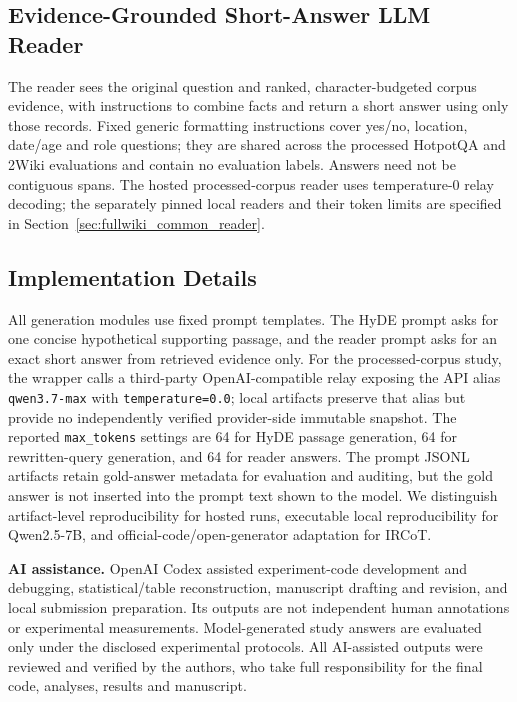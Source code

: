 \subsection{Evidence-Grounded Short-Answer LLM Reader}
\label{sec:short_answer_reader}

The reader sees the original question and ranked, character-budgeted corpus evidence, with instructions to combine facts and return a short answer using only those records. Fixed generic formatting instructions cover yes/no, location, date/age and role questions; they are shared across the processed HotpotQA and 2Wiki evaluations and contain no evaluation labels. Answers need not be contiguous spans. The hosted processed-corpus reader uses temperature-0 relay decoding; the separately pinned local readers and their token limits are specified in Section~\ref{sec:fullwiki_common_reader}.

\subsection{Implementation Details}
\label{sec:implementation_boundary}

All generation modules use fixed prompt templates. The HyDE prompt asks for one concise hypothetical supporting passage, and the reader prompt asks for an exact short answer from retrieved evidence only. For the processed-corpus study, the wrapper calls a third-party OpenAI-compatible relay exposing the API alias \texttt{qwen3.7-max} with \texttt{temperature=0.0}; local artifacts preserve that alias but provide no independently verified provider-side immutable snapshot. The reported \texttt{max\_tokens} settings are 64 for HyDE passage generation, 64 for rewritten-query generation, and 64 for reader answers. The prompt JSONL artifacts retain gold-answer metadata for evaluation and auditing, but the gold answer is not inserted into the prompt text shown to the model. We distinguish artifact-level reproducibility for hosted runs, executable local reproducibility for Qwen2.5-7B, and official-code/open-generator adaptation for IRCoT.

\textbf{AI assistance.} OpenAI Codex assisted experiment-code development and debugging, statistical/table reconstruction, manuscript drafting and revision, and local submission preparation. Its outputs are not independent human annotations or experimental measurements. Model-generated study answers are evaluated only under the disclosed experimental protocols. All AI-assisted outputs were reviewed and verified by the authors, who take full responsibility for the final code, analyses, results and manuscript.


